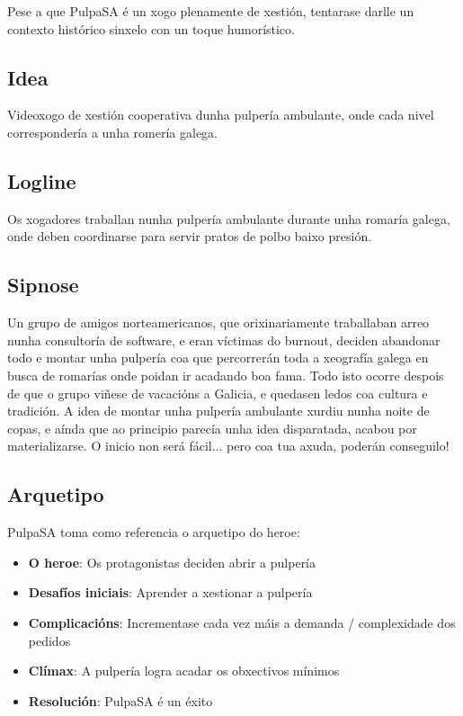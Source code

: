 \documentclass{report}  %
\begin{document}
Pese a que PulpaSA é un xogo plenamente de xestión, tentarase darlle un contexto histórico sinxelo con un toque humorístico.

\subsection{Idea}

Videoxogo de xestión cooperativa dunha pulpería ambulante, onde cada nivel correspondería a unha romería galega.

\subsection{Logline}

Os xogadores traballan nunha pulpería ambulante durante unha romaría galega, onde deben coordinarse para servir pratos de polbo baixo presión.

\subsection{Sipnose}

Un grupo de amigos norteamericanos, que orixinariamente traballaban arreo nunha consultoría de software, e eran víctimas do burnout, deciden
abandonar todo e montar unha pulpería coa que percorrerán toda a xeografía galega en busca de romarías onde poidan ir acadando boa fama.
 Todo isto ocorre despois de que o grupo viñese de vacacións a Galicia, e quedasen ledos coa cultura
e tradición. A idea de montar unha pulpería ambulante xurdiu nunha noite de copas, e aínda que ao principio parecía unha idea disparatada,
acabou por materializarse. O inicio non será fácil... pero coa tua axuda, poderán conseguilo!

\subsection{Arquetipo}

PulpaSA toma como referencia o arquetipo do heroe:
\begin{itemize}
    \item \textbf{O heroe}: Os protagonistas deciden abrir a pulpería
    \item \textbf{Desafíos iniciais}: Aprender a xestionar a pulpería
    \item \textbf{Complicacións}: Incrementase cada vez máis a demanda / complexidade dos pedidos
    \item \textbf{Clímax}: A pulpería logra acadar os obxectivos mínimos
    \item \textbf{Resolución}: PulpaSA é un éxito
\end{itemize}
\end{document}
